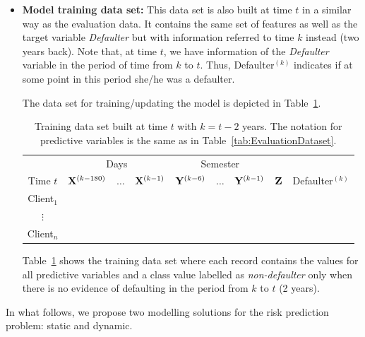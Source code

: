\begin{itemize}
\item \textbf{Model training data set:}  This data set is also built at time $t$ in a similar way as the evaluation data. It contains the same set of features as well as the target variable \textit{Defaulter} but with information referred to time $k$ instead (two years back). Note that, at time $t$, we have information of the \textit{Defaulter} variable in the period of time from $k$ to $t$. Thus,  Defaulter$^{(k)}$ indicates if at some point in this period she/he was a defaulter.

The data set for training/updating the model is depicted in Table~\ref{tab:TrainingDataset}.
\begin{table}[ht!]
\centering
\begin{tabular}{c|ccc|ccc|c|c}
	&\multicolumn{3}{c|}{Days} & \multicolumn{3}{c|}{Semester} & \\
     Time $t$              & $\mathbf{X}^{(k-180)}$ & $\ldots$ & $\mathbf{X}^{(k-1)} $ & $\mathbf{Y}^{(k-6)}$  & $\ldots$ & $\mathbf{Y}^{(k-1)} $ & $\mathbf{Z}$ & Defaulter$^{(k)}$\\  
\hline
Client$_1$  &                                                  &              &                     &                               &                     &        &  \\ 
$\vdots$      &                                                 &               &                     &                                &                     &       & \\ 
Client$_n$  &                                                &               &                     &                                &                     &     & \\ 
\end{tabular} 
\caption{Training data set built at time $t$ with $k=t - 2$ years.  The notation for predictive variables is the same as in Table~\ref{tab:EvaluationDataset}.}
\label{tab:TrainingDataset} 
\end{table}

Table~\ref{tab:TrainingDataset} shows the training data set where each record contains the values for all predictive variables and a class value labelled as \emph{non-defaulter} only when there is no evidence of defaulting in the period from $k$ to $t$ (2 years). 

\end{itemize}

In what follows, we propose two modelling solutions for the risk prediction problem: static and dynamic.

